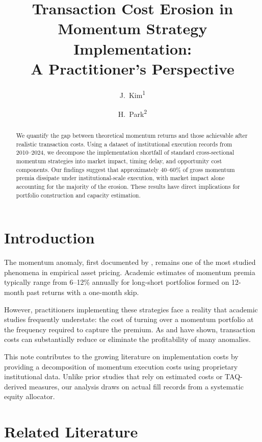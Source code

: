 \documentclass{cris}
\title{Transaction Cost Erosion in Momentum Strategy Implementation:\\ A Practitioner's Perspective}
\author{J.~Kim\textsuperscript{1} \and H.~Park\textsuperscript{2}}
\begin{document}
\maketitle

\begin{abstract}
We quantify the gap between theoretical momentum returns and those achievable after realistic transaction costs. Using a dataset of institutional execution records from 2010--2024, we decompose the implementation shortfall of standard cross-sectional momentum strategies into market impact, timing delay, and opportunity cost components. Our findings suggest that approximately 40--60\% of gross momentum premia dissipate under institutional-scale execution, with market impact alone accounting for the majority of the erosion. These results have direct implications for portfolio construction and capacity estimation.
\end{abstract}

\section{Introduction}

The momentum anomaly, first documented by \citet{jegadeesh1993}, remains one of the most studied phenomena in empirical asset pricing. Academic estimates of momentum premia typically range from 6--12\% annually for long-short portfolios formed on 12-month past returns with a one-month skip.

However, practitioners implementing these strategies face a reality that academic studies frequently understate: the cost of turning over a momentum portfolio at the frequency required to capture the premium. As \citet{novy2012} and \citet{frazzini2014} have shown, transaction costs can substantially reduce or eliminate the profitability of many anomalies.

This note contributes to the growing literature on implementation costs by providing a decomposition of momentum execution costs using proprietary institutional data. Unlike prior studies that rely on estimated costs or TAQ-derived measures, our analysis draws on actual fill records from a systematic equity allocator.

\section{Related Literature}
\end{document}
